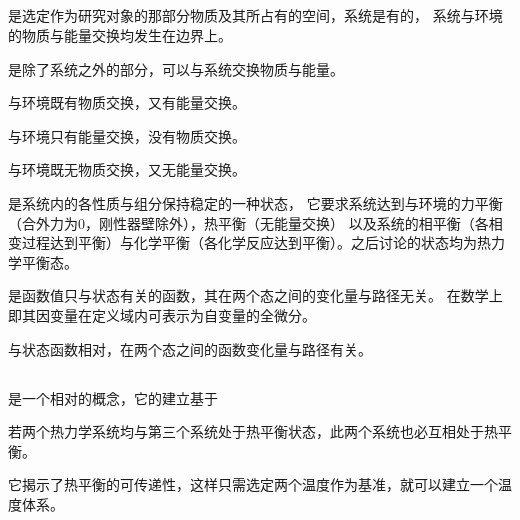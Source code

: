         \subsection[基本概念]{}
            \begin{Itemize}
                \item {}是选定作为研究对象的那部分物质及其所占有的空间，系统是有\linebreak 的，
                系统与环境的物质与能量交换均发生在边界上。
                \item {}是除了系统之外的部分，可以与系统交换物质与能量。
                \item {}与环境既有物质交换，又有能量交换。
                \item {}与环境只有能量交换，没有物质交换。
                \item {}与环境既无物质交换，又无能量交换。
                \item {}是系统内的各性质与组分保持稳定的一种状态，
                它要求系统达到与环境的力平衡（合外力为0，刚性器壁除外），热平衡（无能量交换）
                以及系统的相平衡（各相变过程达到平衡）与化学平衡（各化学反应达到平衡）。之后讨论的状态均为热力学平衡态。
                \item {}是函数值只与状态有关的函数，其在两个态之间的变化量与路径无关。
                在数学上即其因变量在定义域内可表示为自变量的全微分。
                \item {}与状态函数相对，在两个态之间的函数变化量与路径有关。
            \end{Itemize}
        \subsection[温度]{}
            是一个相对的概念，它的建立基于
            \begin{law}
                若两个热力学系统均与第三个系统处于热平衡状态，此两个系统也必互相处于热平衡。
            \end{law}
          
            它揭示了热平衡的可传递性，这样只需选定两个温度作为基准，就可以建立一个温度体系。

